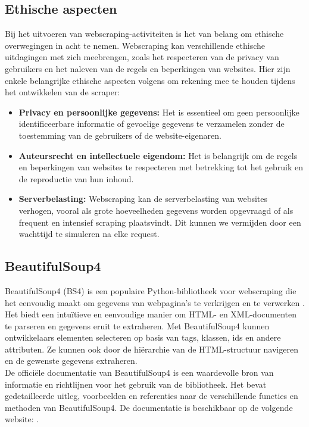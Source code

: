 \subsection{Ethische aspecten}
\label{subsection:scraper-ethische-aspecten}
Bij het uitvoeren van webscraping-activiteiten is het van belang om ethische overwegingen in acht te nemen. Webscraping kan verschillende ethische uitdagingen met zich meebrengen, zoals het respecteren van de privacy van gebruikers en het naleven van de regels en beperkingen van websites. Hier zijn enkele belangrijke ethische aspecten volgens \autocite{scrape_ethics} om rekening mee te houden tijdens het ontwikkelen van de scraper: 

\begin{itemize}
    \item \textbf{Privacy en persoonlijke gegevens:} Het is essentieel om geen persoonlijke identificeerbare informatie of gevoelige gegevens te verzamelen zonder de toestemming van de gebruikers of de website-eigenaren.
    \item \textbf{Auteursrecht en intellectuele eigendom:} Het is belangrijk om de regels en beperkingen van websites te respecteren met betrekking tot het gebruik en de reproductie van hun inhoud.
    \item \textbf{Serverbelasting:} Webscraping kan de serverbelasting van websites verhogen, vooral als grote hoeveelheden gegevens worden opgevraagd of als frequent en intensief scraping plaatsvindt. Dit kunnen we vermijden door een wachttijd te simuleren na elke request. 
\end{itemize}

\subsection{BeautifulSoup4}
BeautifulSoup4 (BS4) is een populaire Python-bibliotheek voor webscraping die het eenvoudig maakt om gegevens van webpagina's te verkrijgen en te verwerken \autocite{BIO2014, BSFOR2015}. \\

Het biedt een intuïtieve en eenvoudige manier om HTML- en XML-documenten te parseren en gegevens eruit te extraheren. Met BeautifulSoup4 kunnen ontwikkelaars elementen selecteren op basis van tags, klassen, ids en andere attributen. Ze kunnen ook door de hiërarchie van de HTML-structuur navigeren en de gewenste gegevens extraheren. \\

De officiële documentatie van BeautifulSoup4 is een waardevolle bron van informatie en richtlijnen voor het gebruik van de bibliotheek. Het bevat gedetailleerde uitleg, voorbeelden en referenties naar de verschillende functies en methoden van BeautifulSoup4. 
De documentatie is beschikbaar op de volgende website: \autocite{BS4Documentation}. \\



